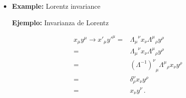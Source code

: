 \begin{itemize}
\item
\begin{english}
\textbf{Example:} Lorentz invariance    
\end{english}
\begin{spanish}
\textbf{Ejemplo:} Invarianza de Lorentz
\end{spanish}
  \begin{align}
    x_\mu y^\mu\to x'_\mu{y'}^\mu=&{\Lambda_\mu}^\nu x_\nu{\Lambda^\mu}_\rho y^\rho \nonumber\\
    =&{\Lambda_\mu}^\nu x_\nu{\Lambda^\mu}_\rho y^\rho \nonumber\\
    =&{\left(\Lambda^{-1}\right)^\nu}_\mu{\Lambda^\mu}_\rho x_\nu y^\rho \nonumber\\
    =&\delta^\nu_\rho x_\nu y^\rho \nonumber\\
    =&x_\nu y^\nu \nonumber\,.
  \end{align}

\end{itemize}



